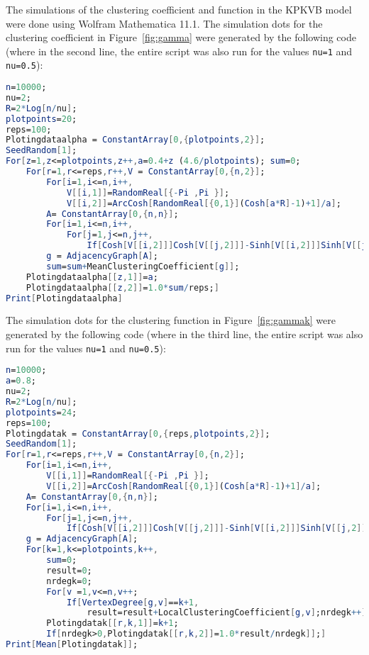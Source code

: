\begin{appendices}
The simulations of the clustering coefficient and function in the KPKVB model were done using Wolfram Mathematica 11.1.
The simulation dots for the clustering coefficient in Figure~\ref{fig:gamma} were generated by the following code (where in the second line, the entire script was also run for the values \verb|nu=1| and \verb|nu=0.5|):
\begin{lstlisting}[language=Mathematica,breaklines]
n=10000;
nu=2;
R=2*Log[n/nu];
plotpoints=20;
reps=100;
Plotingdataalpha = ConstantArray[0,{plotpoints,2}];
SeedRandom[1];
For[z=1,z<=plotpoints,z++,a=0.4+z (4.6/plotpoints); sum=0;
	For[r=1,r<=reps,r++,V = ConstantArray[0,{n,2}];
		For[i=1,i<=n,i++,
			V[[i,1]]=RandomReal[{-Pi ,Pi }];
			V[[i,2]]=ArcCosh[RandomReal[{0,1}](Cosh[a*R]-1)+1]/a];
		A= ConstantArray[0,{n,n}];
		For[i=1,i<=n,i++,
			For[j=1,j<=n,j++,
				If[Cosh[V[[i,2]]]Cosh[V[[j,2]]]-Sinh[V[[i,2]]]Sinh[V[[j,2]]]Cos[Abs[V[[i,1]]-V[[j,1]]]] <= Cosh[R] && i != j,A[[i,j]]=1,A[[i,j]]=0]]];
		g = AdjacencyGraph[A];
		sum=sum+MeanClusteringCoefficient[g]];
	Plotingdataalpha[[z,1]]=a;
	Plotingdataalpha[[z,2]]=1.0*sum/reps;]
Print[Plotingdataalpha]
\end{lstlisting}
The simulation dots for the clustering function in Figure~\ref{fig:gammak} were generated by the following code (where in the third line, the entire script was also run for the values \verb|nu=1| and \verb|nu=0.5|):
\begin{lstlisting}[language=Mathematica,breaklines]
n=10000;
a=0.8;
nu=2;
R=2*Log[n/nu];
plotpoints=24;
reps=100;
Plotingdatak = ConstantArray[0,{reps,plotpoints,2}];
SeedRandom[1];
For[r=1,r<=reps,r++,V = ConstantArray[0,{n,2}];
	For[i=1,i<=n,i++,
		V[[i,1]]=RandomReal[{-Pi ,Pi }];
		V[[i,2]]=ArcCosh[RandomReal[{0,1}](Cosh[a*R]-1)+1]/a];
	A= ConstantArray[0,{n,n}];
	For[i=1,i<=n,i++,
		For[j=1,j<=n,j++,
			If[Cosh[V[[i,2]]]Cosh[V[[j,2]]]-Sinh[V[[i,2]]]Sinh[V[[j,2]]]Cos[Abs[V[[i,1]]-V[[j,1]]]] <= Cosh[R] && i != j,A[[i,j]]=1,A[[i,j]]=0]]];
	g = AdjacencyGraph[A];
	For[k=1,k<=plotpoints,k++,
		sum=0;
		result=0;
		nrdegk=0;
		For[v =1,v<=n,v++; 
			If[VertexDegree[g,v]==k+1,
				result=result+LocalClusteringCoefficient[g,v];nrdegk++]];
		Plotingdatak[[r,k,1]]=k+1;
		If[nrdegk>0,Plotingdatak[[r,k,2]]=1.0*result/nrdegk]];]
Print[Mean[Plotingdatak]];
\end{lstlisting}

\end{appendices}